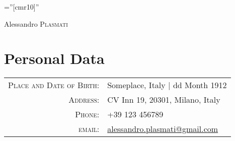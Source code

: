 \documentclass[a4paper,10pt]{article}
\begin{document}

\pagestyle{empty} %

\font\fb=''[cmr10]'' %

\par{\centering
		{\Huge Alessandro \textsc{Plasmati}
	}\bigskip\par}

\section{Personal Data}

\begin{tabular}{rl}
    \textsc{Place and Date of Birth:} & Someplace, Italy  | dd Month 1912 \\
    \textsc{Address:}   & CV Inn 19, 20301, Milano, Italy \\
    \textsc{Phone:}     & +39 123 456789\\
    \textsc{email:}     & \href{mailto:alessandro.plasmati@gmail.com}{alessandro.plasmati@gmail.com}
\end{tabular}

\end{document}
